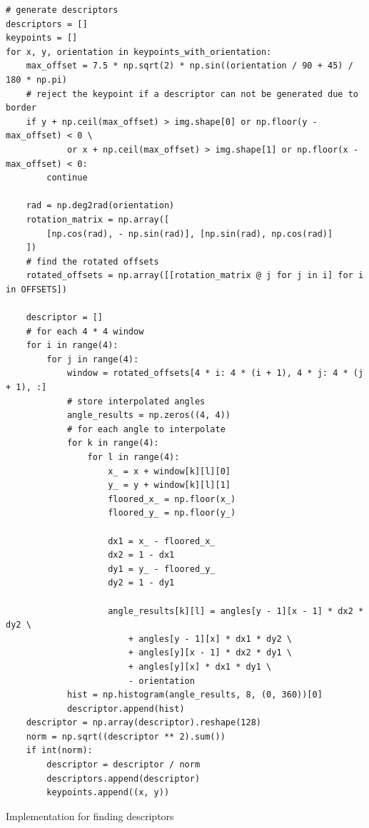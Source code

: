 \documentclass{ee208report}
\begin{document}
\begin{listing}
    \begin{verbatim}
# generate descriptors
descriptors = []
keypoints = []
for x, y, orientation in keypoints_with_orientation:
    max_offset = 7.5 * np.sqrt(2) * np.sin((orientation / 90 + 45) / 180 * np.pi)
    # reject the keypoint if a descriptor can not be generated due to border
    if y + np.ceil(max_offset) > img.shape[0] or np.floor(y - max_offset) < 0 \
            or x + np.ceil(max_offset) > img.shape[1] or np.floor(x - max_offset) < 0:
        continue

    rad = np.deg2rad(orientation)
    rotation_matrix = np.array([
        [np.cos(rad), - np.sin(rad)], [np.sin(rad), np.cos(rad)]
    ])
    # find the rotated offsets
    rotated_offsets = np.array([[rotation_matrix @ j for j in i] for i in OFFSETS])

    descriptor = []
    # for each 4 * 4 window
    for i in range(4):
        for j in range(4):
            window = rotated_offsets[4 * i: 4 * (i + 1), 4 * j: 4 * (j + 1), :]
            # store interpolated angles
            angle_results = np.zeros((4, 4))
            # for each angle to interpolate
            for k in range(4):
                for l in range(4):
                    x_ = x + window[k][l][0]
                    y_ = y + window[k][l][1]
                    floored_x_ = np.floor(x_)
                    floored_y_ = np.floor(y_)
                    
                    dx1 = x_ - floored_x_
                    dx2 = 1 - dx1
                    dy1 = y_ - floored_y_
                    dy2 = 1 - dy1
                    
                    angle_results[k][l] = angles[y - 1][x - 1] * dx2 * dy2 \
                        + angles[y - 1][x] * dx1 * dy2 \
                        + angles[y][x - 1] * dx2 * dy1 \
                        + angles[y][x] * dx1 * dy1 \
                        - orientation
            hist = np.histogram(angle_results, 8, (0, 360))[0]
            descriptor.append(hist)
    descriptor = np.array(descriptor).reshape(128)
    norm = np.sqrt((descriptor ** 2).sum())
    if int(norm):
        descriptor = descriptor / norm
        descriptors.append(descriptor)
        keypoints.append((x, y))
    \end{verbatim}
    \caption{Implementation for finding descriptors}
    \label{lst:descriptor}
\end{listing}
\end{document}
